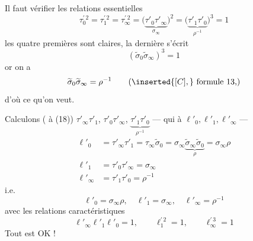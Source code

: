 Il faut vérifier les relations essentielles
\[
\tau_0^{\prime\,2}=\tau_1^{\prime\,2}=\tau_\infty^{\prime\,2}
=\bigl(\underbrace{\tau'_0\tau'_\infty}_{\sigma_\infty}\bigr)^2
=\bigl(\underbrace{\tau'_1\tau'_0}_{\rho^{-1}}\bigr)^3=1
\tag{23}
\]
les quatre premières sont claires, la dernière s'écrit
\[
(\widetilde{\sigma}_0\widetilde{\sigma}_\infty)^3=1
\]
or on a
\[
\widetilde{\sigma}_0\widetilde{\sigma}_\infty=\rho^{-1}
\qquad (\inserted{[C],}\ \text{formule 13,})
\]
d'où ce qu'on veut.

Calculons ( à (18)) $\tau'_\infty\tau'_1$, $\tau'_0\tau'_\infty$, $\underbrace{\tau'_1\tau'_0}_{\rho^{-1}}$ --- qui  à $\ell'_0,\ell'_1,\ell'_\infty$ ---
\[
\begin{aligned}
\ell'_0&=\tau'_\infty\tau'_1=\tau_\infty\widetilde{\sigma}_0
=\sigma_\infty\underbrace{\widetilde{\sigma}_\infty\widetilde{\sigma}_0}_{\rho}
=\sigma_\infty\rho\\
\ell'_1&=\tau'_0\tau'_\infty=\sigma_\infty\\
\ell'_\infty&=\tau'_1\tau'_0=\rho^{-1}
\end{aligned}
\]
i.e.
\[
\ell'_0=\sigma_\infty\rho,\quad \ell'_1=\sigma_\infty,\quad \ell'_\infty=\rho^{-1}
\tag{24}
\]
avec les relations caractéristiques
\[
\ell'_\infty\ell'_1\ell'_0=1,\qquad \ell_1^{\prime\,2}=1,\qquad \ell_\infty^{\prime\,3}=1
\tag{25}
\]
Tout est OK !


